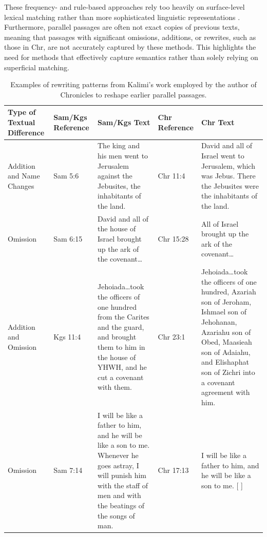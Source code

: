 \documentclass[12pt]{article}
\begin{document}
These frequency- and rule-based approaches rely too heavily on surface-level lexical matching rather than more sophisticated linguistic representations \cite{Mars}. Furthermore, parallel passages are often not exact copies of previous texts, meaning that passages with significant omissions, additions, or rewrites, such as those in Chr, are not accurately captured by these methods. This highlights the need for methods that effectively capture semantics rather than solely relying on superficial matching.

\begin{table}[htbp]
\centering
\begin{tabularx}{\textwidth}{
  @{}>{\raggedright\arraybackslash}p{2cm}
     >{\raggedright\arraybackslash}p{1.8cm}
     >{\raggedright\arraybackslash}X
     >{\raggedright\arraybackslash}p{1.8cm}
     >{\raggedright\arraybackslash}X@{}
}
\toprule
\textbf{Type of Textual Difference} 
 & \textbf{Sam/Kgs Reference} 
 & \textbf{Sam/Kgs Text} 
 & \textbf{Chr Reference} 
 & \textbf{Chr Text} \\
\midrule
Addition and Name Changes 
 & 2 Sam 5:6 
 & The king and his men went to Jerusalem against the Jebusites, the inhabitants of the land.
 & 1 Chr 11:4
 & David and all of Israel went to Jerusalem, which was Jebus. There the Jebusites were the inhabitants of the land. \\[1ex]

Omission 
 & 2 Sam 6:15 
 & David and all of the house of Israel brought up the ark of the covenant\ldots 
 & 1 Chr 15:28 
 & [ ] All of Israel brought up the ark of the covenant\ldots \\[1ex]

Addition and Omission 
 & 2 Kgs 11:4 
 & Jehoiada\ldots took the officers of one hundred from the Carites and the guard, and brought them to him in the house of YHWH, and he cut a covenant with them.
 & 2 Chr 23:1
 & Jehoiada\ldots took the officers of one hundred, Azariah son of Jeroham, Ishmael son of Jehohanan, Azariahu son of Obed, Maasieah son of Adaiahu, and Elishaphat son of Zichri into a covenant agreement with him. \\[1ex]

Omission 
 & 2 Sam 7:14 
 & I will be like a father to him, and he will be like a son to me. Whenever he goes astray, I will punish him with the staff of men and with the beatings of the songs of man.
 & 1 Chr 17:13
 & I will be like a father to him, and he will be like a son to me. [ ] \\
\bottomrule
\end{tabularx}
\caption{Examples of rewriting patterns from Kalimi's work \cite{Kalimi} employed by the author of Chronicles to reshape earlier parallel passages.}
\label{tab:kalimi}
\end{table}
\end{document}
